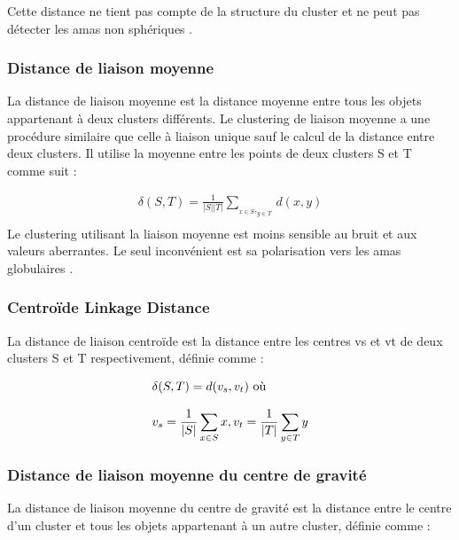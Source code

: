 Cette distance ne tient pas compte de la structure du cluster et ne peut pas détecter les amas non sphériques \cite{kumar2014performance}.
\subsubsection{Distance de liaison moyenne}
La distance de liaison moyenne est la distance moyenne entre tous les objets appartenant à deux clusters différents. Le clustering de liaison moyenne a une procédure similaire que celle à liaison unique sauf le calcul de la distance entre deux clusters. Il utilise la moyenne entre les points de deux clusters S et T comme suit \cite{kumar2014performance} :

\begin{equation}
	\begin{split}
		\delta (S,T) = \frac{1}{\left\lvert S \right\rvert \left\lvert T \right\rvert  } \sum_{_{ x \in S},_{y \in T}} d(x,y)  \\
	\end{split}
\end{equation}
Le clustering utilisant la liaison moyenne est moins sensible au bruit et aux valeurs aberrantes. Le seul inconvénient est sa polarisation vers les amas globulaires \cite{pang2005introduction}.

\subsubsection{Centroïde Linkage Distance}
La distance de liaison centroïde est la distance entre les centres vs et vt de deux clusters S et T respectivement, définie comme :

\begin{equation}
	\begin{tabular}{@{}l@{}}
		\(\displaystyle \delta (S,T) = d(v_{s}, v_{t} ) \) où \\ \\
		\(\displaystyle v_{s} = \frac{1}{\left\lvert S \right\rvert}  \sum_{x \in S} x,v_{t} = \frac{1}{\left\lvert T \right\rvert} \sum_{y \in T}y  \) 
	\end{tabular} 
\end{equation}

\subsubsection{Distance de liaison moyenne du centre de gravité}
La distance de liaison moyenne du centre de gravité est la distance entre le centre d'un cluster et tous les objets appartenant à un autre cluster, définie comme :

